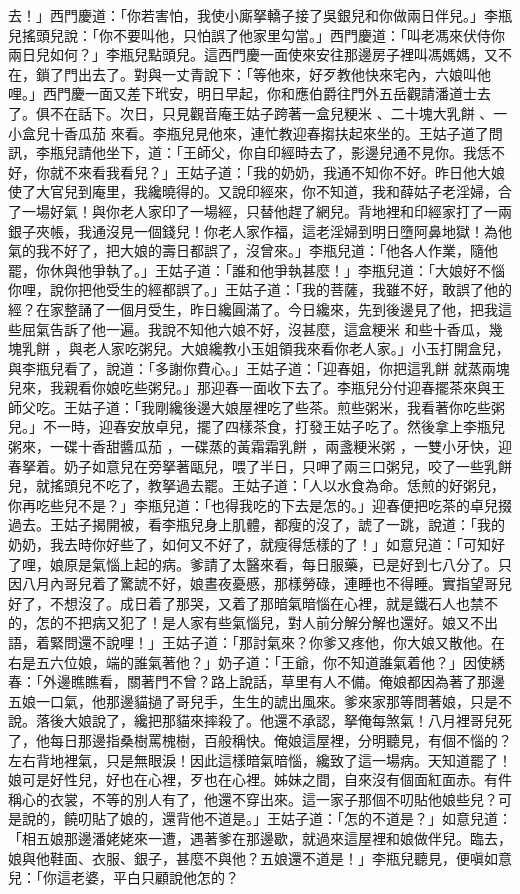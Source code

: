 去！」西門慶道：「你若害怕，我使小廝拏轎子接了吳銀兒和你做兩日伴兒。」李瓶兒搖頭兒說：「你不要叫他，只怕誤了他家里勾當。」西門慶道：「叫老馮來伏侍你兩日兒如何？」李瓶兒點頭兒。這西門慶一面使來安往那邊房子裡叫馮媽媽，又不在，鎖了門出去了。對與一丈青說下：「等他來，好歹教他快來宅內，六娘叫他哩。」西門慶一面又差下玳安，明日早起，你和應伯爵往門外五岳觀請潘道士去了。俱不在話下。次日，只見觀音庵王姑子跨著一盒兒粳米 、二十塊大乳餅 、一小盒兒十香瓜茄 來看。李瓶兒見他來，連忙教迎春搊扶起來坐的。王姑子道了問訊，李瓶兒請他坐下，道：「王師父，你自印經時去了，影邊兒通不見你。我恁不好，你就不來看我看兒？」王姑子道：「我的奶奶，我通不知你不好。昨日他大娘使了大官兒到庵里，我纔曉得的。又說印經來，你不知道，我和薛姑子老淫婦，合了一場好氣！與你老人家印了一場經，只替他趕了網兒。背地裡和印經家打了一兩銀子夾帳，我通沒見一個錢兒！你老人家作福，這老淫婦到明日墮阿鼻地獄！為他氣的我不好了，把大娘的壽日都誤了，沒曾來。」李瓶兒道：「他各人作業，隨他罷，你休與他爭執了。」王姑子道：「誰和他爭執甚麼！」李瓶兒道：「大娘好不惱你哩，說你把他受生的經都誤了。」王姑子道：「我的菩薩，我雖不好，敢誤了他的經？在家整誦了一個月受生，昨日纔圓滿了。今日纔來，先到後邊見了他，把我這些屈氣告訴了他一遍。我說不知他六娘不好，沒甚麼，這盒粳米 和些十香瓜，幾塊乳餅 ，與老人家吃粥兒。大娘纔教小玉姐領我來看你老人家。」小玉打開盒兒，與李瓶兒看了，說道：「多謝你費心。」王姑子道：「迎春姐，你把這乳餅 就蒸兩塊兒來，我親看你娘吃些粥兒。」那迎春一面收下去了。李瓶兒分付迎春擺茶來與王師父吃。王姑子道：「我剛纔後邊大娘屋裡吃了些茶。煎些粥米，我看著你吃些粥兒。」不一時，迎春安放卓兒，擺了四樣茶食，打發王姑子吃了。然後拿上李瓶兒粥來，一碟十香甜醬瓜茄 ，一碟蒸的黃霜霜乳餅 ，兩盞粳米粥 ，一雙小牙快，迎春拏着。奶子如意兒在旁拏著甌兒，喂了半日，只呷了兩三口粥兒，咬了一些乳餅兒，就搖頭兒不吃了，教拏過去罷。王姑子道：「人以水食為命。恁煎的好粥兒，你再吃些兒不是？」李瓶兒道：「也得我吃的下去是怎的。」迎春便把吃茶的卓兒掇過去。王姑子揭開被，看李瓶兒身上肌體，都瘦的沒了，諕了一跳，說道：「我的奶奶，我去時你好些了，如何又不好了，就瘦得恁樣的了！」如意兒道：「可知好了哩，娘原是氣惱上起的病。爹請了太醫來看，每日服藥，已是好到七八分了。只因八月內哥兒着了驚諕不好，娘晝夜憂慼，那樣勞碌，連睡也不得睡。實指望哥兒好了，不想沒了。成日着了那哭，又着了那暗氣暗惱在心裡，就是鐵石人也禁不的，怎的不把病又犯了！是人家有些氣惱兒，對人前分解分解也還好。娘又不出語，着緊問還不說哩！」王姑子道：「那討氣來？你爹又疼他，你大娘又散他。在右是五六位娘，端的誰氣著他？」奶子道：「王爺，你不知道誰氣着他？」因使綉春：「外邊瞧瞧看，關著門不曾？路上說話，草里有人不備。俺娘都因為著了那邊五娘一口氣，他那邊貓撾了哥兒手，生生的諕出風來。爹來家那等問著娘，只是不說。落後大娘說了，纔把那貓來摔殺了。他還不承認，拏俺每煞氣！八月裡哥兒死了，他每日那邊指桑樹罵槐樹，百般稱快。俺娘這屋裡，分明聽見，有個不惱的？左右背地裡氣，只是無眼淚！因此這樣暗氣暗惱，纔致了這一場病。天知道罷了！娘可是好性兒，好也在心裡，歹也在心裡。姊妹之間，自來沒有個面紅面赤。有件稱心的衣裳，不等的別人有了，他還不穿出來。這一家子那個不叨貼他娘些兒？可是說的，饒叨貼了娘的，還背他不道是。」王姑子道：「怎的不道是？」如意兒道：「相五娘那邊潘姥姥來一遭，遇著爹在那邊歇，就過來這屋裡和娘做伴兒。臨去，娘與他鞋面、衣服、銀子，甚麼不與他？五娘還不道是！」李瓶兒聽見，便嗔如意兒：「你這老婆，平白只顧說他怎的？